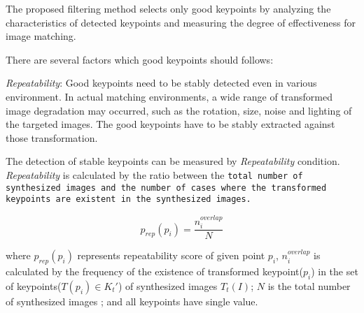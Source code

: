 
The proposed filtering method selects only good keypoints by analyzing the characteristics of detected keypoints and measuring the degree of effectiveness for image matching. 

There are several factors which good keypoints should follows:

\textit{Repeatability}: Good keypoints need to be stably detected even in various environment. In actual matching environments, a wide range of transformed image degradation may occurred, such as the rotation, size, noise and lighting of the targeted images. The good keypoints have to be stably extracted against those transformation.

The detection of stable keypoints can be measured by \textit{Repeatability} condition. \textit{Repeatability} is calculated by the ratio between the \texttt{total number of synthesized images and the number of cases where the transformed keypoints are existent in the synthesized images. }


\begin{equation}
p_{rep}(p_i) = \frac{n_i^{overlap}}{N}
\end{equation}


\noindent
where $p_{rep}(p_i)$ represents repeatability score of given point $p_i$, $n_i^{overlap}$ is calculated by the frequency of the existence of transformed keypoint($p_i$) in the set of keypoints($T(p_i)\in K_t'$) of synthesized images $T_t(I)$; $N$ is the total number of synthesized images ; and all keypoints have single value. 

